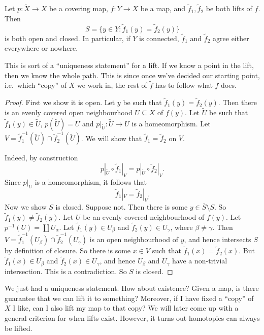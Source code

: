 \documentclass[a4paper]{article}
\begin{document}
\begin{lemma}
  Let $p: \tilde{X} \to X$ be a covering map, $f: Y\to X$ be a map, and $\tilde{f}_1 ,\tilde{f}_2$ be both lifts of $f$. Then
  \[
    S = \{y\in Y: \tilde{f}_1(y) = \tilde{f}_2(y)\}
  \]
  is both open and closed. In particular, if $Y$ is connected, $\tilde{f}_1$ and $\tilde{f}_2$ agree either everywhere or nowhere.
\end{lemma}
This is sort of a ``uniqueness statement'' for a lift. If we know a point in the lift, then we know the whole path. This is since once we've decided our starting point, i.e.\ which ``copy'' of $X$ we work in, the rest of $\tilde{f}$ has to follow what $f$ does.

\begin{proof}
  First we show it is open. Let $y$ be such that $\tilde{f}_1(y) = \tilde{f}_2(y)$. Then there is an evenly covered open neighbourhood $U \subseteq X$ of $f(y)$. Let $\tilde{U}$ be such that $\tilde{f}_1(y) \in \tilde{U}$, $p(\tilde{U}) = U$ and $p|_{\tilde{U}} : \tilde{U} \to U$ is a homeomorphism. Let $V = \tilde{f}_1^{-1}(\tilde{U}) \cap \tilde{f}_2^{-1}(\tilde{U})$. We will show that $\tilde{f}_1 = \tilde{f}_2$ on $V$.

  Indeed, by construction
  \[
    p|_{\tilde{U}} \circ \tilde{f}_1|_V = p|_{\tilde{U}} \circ \tilde{f}_2|_V.
  \]
  Since $p|_{\tilde{U}}$ is a homeomorphism, it follows that
  \[
    \tilde{f}_1|_V = \tilde{f}_2|_V.
  \]
  Now we show $S$ is closed. Suppose not. Then there is some $y \in \bar{S} \setminus S$. So $\tilde{f}_1(y) \not= \tilde{f}_2(y)$. Let $U$ be an evenly covered neighbourhood of $f(y)$. Let $p^{-1}(U) = \coprod U_\alpha$. Let $\tilde{f}_1(y) \in U_\beta$ and $\tilde{f}_2(y) \in U_\gamma$, where $\beta \not= \gamma$. Then $V = \tilde{f}_1^{-1}(U_\beta) \cap \tilde{f}_2^{-1}(U_\gamma)$ is an open neighbourhood of $y$, and hence intersects $S$ by definition of closure. So there is some $x \in V$ such that $\tilde{f}_1(x) = \tilde{f}_2(x)$. But $\tilde{f}_1(x) \in U_\beta$ and $\tilde{f}_2(x) \in U_\gamma$, and hence $U_\beta$ and $U_\gamma$ have a non-trivial intersection. This is a contradiction. So $S$ is closed.
\end{proof}

We just had a uniqueness statement. How about existence? Given a map, is there guarantee that we can lift it to something? Moreover, if I have fixed a ``copy'' of $X$ I like, can I also lift my map to that copy? We will later come up with a general criterion for when lifts exist. However, it turns out homotopies can always be lifted.
\end{document}
